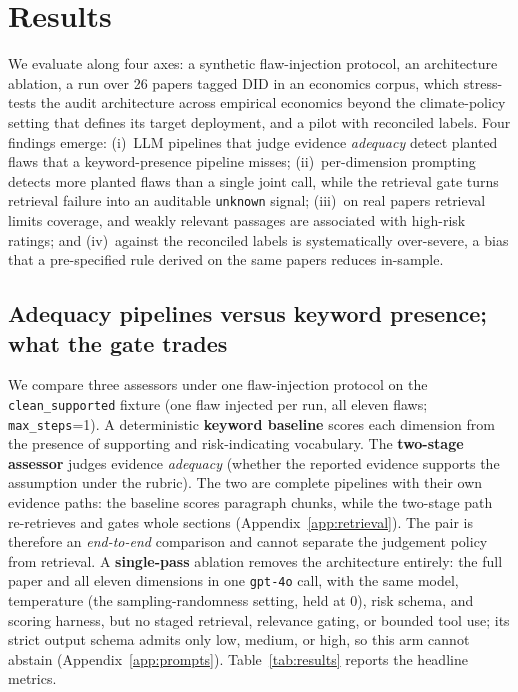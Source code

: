 \section{Results}
\label{sec:results}

We evaluate \sys{} along four axes: a synthetic flaw-injection protocol, an
architecture ablation, a run over 26 papers tagged DID in an economics corpus,
which stress-tests the audit architecture across empirical economics beyond
the climate-policy setting that defines its target deployment, and a pilot with reconciled labels. Four
findings emerge: (i)~LLM pipelines that judge evidence \emph{adequacy} detect
planted flaws that a keyword-presence pipeline misses; (ii)~per-dimension
prompting detects more planted flaws than a single joint call, while the
retrieval gate turns retrieval failure into an auditable \texttt{unknown}
signal; (iii)~on real papers retrieval limits coverage, and weakly relevant
passages are associated with high-risk ratings; and (iv)~against the
reconciled labels \sys{} is systematically over-severe, a bias that a
pre-specified rule derived on the same papers reduces in-sample.

\subsection{Adequacy pipelines versus keyword presence; what the gate trades}
\label{sec:ablation}

We compare three assessors under one flaw-injection protocol on the
\texttt{clean\_supported} fixture (one flaw injected per run, all eleven flaws;
\texttt{max\_steps}{=}1). A deterministic \textbf{keyword baseline} scores each
dimension from the presence of supporting and risk-indicating vocabulary. The
\textbf{two-stage \sys{} assessor} judges evidence \emph{adequacy} (whether the
reported evidence supports the assumption under the rubric). The two are complete
pipelines with their own evidence paths: the baseline scores paragraph chunks,
while the two-stage path re-retrieves and gates whole sections
(Appendix~\ref{app:retrieval}). The pair is therefore an \emph{end-to-end}
comparison and cannot separate the judgement policy from retrieval.
A \textbf{single-pass} ablation removes the architecture entirely: the
full paper and all eleven dimensions in one \texttt{gpt-4o} call, with the same
model, temperature (the sampling-randomness setting, held at $0$), risk schema,
and scoring harness, but no staged retrieval,
relevance gating, or bounded tool use; its strict output schema admits only
low, medium, or high, so this arm cannot abstain
(Appendix~\ref{app:prompts}). Table~\ref{tab:results} reports the headline metrics.

